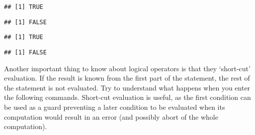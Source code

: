 \documentclass[paper=a4,headsepline,BCOR=12mm,twoside,open=right,%
titlepage,headings=small,fontsize=10pt,index=totoc,bibliography=totoc,%
captions=tableheading,captions=nooneline]{scrbook}\usepackage{knitr}
\begin{document}
\begin{knitrout}\footnotesize
{}\color{fgcolor}\begin{kframe}
\begin{alltt}
\end{alltt}
\begin{verbatim}
## [1] TRUE
\end{verbatim}
\begin{alltt}
\end{alltt}
\begin{verbatim}
## [1] FALSE
\end{verbatim}
\begin{alltt}
 \hlopt{&} 
\end{alltt}
\begin{verbatim}
## [1] TRUE
\end{verbatim}
\begin{alltt}
 \hlopt{&} 
\end{alltt}
\begin{verbatim}
## [1] FALSE
\end{verbatim}
\end{kframe}
\end{knitrout}

Another important thing to know about logical operators is that they `short-cut' evaluation. If the result is known from the first part of the statement, the rest of the statement is not evaluated. Try to understand what happens when you enter the following commands. Short-cut evaluation is useful, as the first condition can be used as a guard preventing a later condition to be evaluated when its computation would result in an error (and possibly abort of the whole computation).
\end{document}
